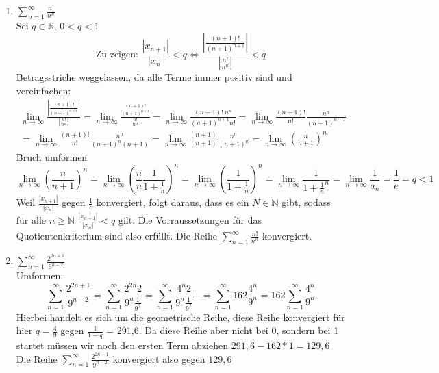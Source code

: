 \documentclass{article}
\begin{document}
\begin{enumerate}[ label= (\roman*) ]
        \item \( \sum_{n=1}^{\infty} \frac{n!}{n^n} \) \\
        Sei \(q \in \mathbb{R}\), \(0 < q < 1\) \\
        \[ \text{Zu zeigen: } \frac{|x_{n+1}|}{|x_{n}|} < q \Leftrightarrow  \frac{  \left| \frac{(n+1)!}{{(n+1)}^{n+1}} \right| }{ \left| \frac{n!}{n^n} \right| } < q \]
        Betragsstriche weggelassen, da alle Terme immer positiv sind und vereinfachen:
        \begin{gather*}
            \lim_{n \to \infty} \frac{|\frac{(n+1)!}{{(n+1)}^{n+1}}|}{|\frac{n!}{n^n}|}
            = \lim_{n \to \infty} \frac{\frac{(n+1)!}{{(n+1)}^{n+1}}}{\frac{n!}{n^n}}
            = \lim_{n \to \infty} \frac{(n+1)! \: n^n}{ {(n+1)}^{n+1} n! }
            = \lim_{n \to \infty} \frac{(n+1)!}{n!} \frac{n^n}{{(n+1)}^{n+1}} \\
            = \lim_{n \to \infty} \frac{(n+1)!}{n!} \frac{n^n}{ {(n+1)}^{n} (n+1)}
            = \lim_{n \to \infty} \frac{(n+1)}{(n+1)} \frac{n^n}{{(n+1)}^{n}} 
            = \lim_{n \to \infty} {\left( \frac{n}{n+1} \right)}^n 
        \end{gather*}
        Bruch umformen
        \[
            \lim_{n \to \infty} {\left( \frac{n}{n+1} \right)}^{n} =
            \lim_{n \to \infty} {\left( \frac{n}{n} \frac{1}{1+ \frac{1}{n}} \right)}^{n} =
            \lim_{n \to \infty} {\left( \frac{1}{1+ \frac{1}{n}} \right)}^{n} = 
            \lim_{n \to \infty} \frac{1}{ { 1 + \frac{1}{n} }^{n} } =
            \lim_{n \to \infty} \frac{1}{ a_n } =
            \frac{1}{e} = q < 1
        \]
        Weil \(\frac{|x_{n+1}|}{|x_{n}|}\) gegen \(\frac{1}{e}\) konvergiert,
        folgt daraus, dass es ein \(N \in \mathbb{N}\) gibt, sodass für alle \(n \geq \mathbb{N} \) \(\frac{|x_{n+1}|}{|x_{n}|} < q\) gilt.
        Die Vorraussetzungen für das Quotientenkriterium sind also erfüllt.
        Die Reihe \( \sum_{n=1}^{\infty} \frac{n!}{n^n} \) konvergiert.

        \item \( \sum_{n=1}^{\infty} \frac{ 2^{2n+1} }{ 9^{n-2}} \) \\
        Umformen:
        \[
            \sum_{n=1}^{\infty} \frac{ 2^{2n+1} }{ 9^{n-2}}
            = \sum_{n=1}^{\infty} \frac{ 2^{2n} 2 }{ 9^{n} \frac{1}{9^2}}
            = \sum_{n=1}^{\infty} \frac{ 4^{n} 2 }{ 9^{n} \frac{1}{9^2}}+
            = \sum_{n=1}^{\infty} 162 \frac{ 4^{n} }{ 9^{n} }
            = 162 \sum_{n=1}^{\infty} \frac{ 4^{n} }{ 9^{n} }
         \]
         Hierbei handelt es sich um die geometrische Reihe, diese Reihe konvergiert für hier \(q = \frac{4}{9}\) gegen \(\frac{1}{1-q}\) = 291,6.
         Da diese Reihe aber nicht bei 0, sondern bei 1 startet müssen wir noch den ersten Term abziehen \(291,6 - 162*1 = 129,6\)
         Die Reihe \( \sum_{n=1}^{\infty} \frac{ 2^{2n+1} }{ 9^{n-2}} \) konvergiert also gegen \(129,6\)
    \end{enumerate}
\end{document}
